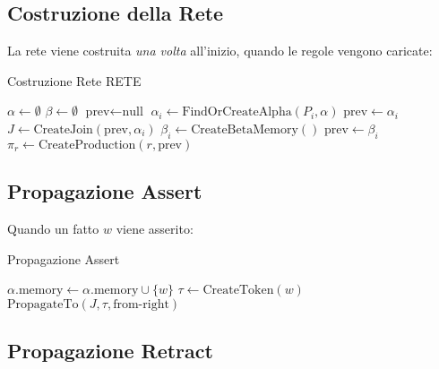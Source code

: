 \subsection{Costruzione della Rete}

La rete viene costruita \textit{una volta} all'inizio, quando le regole vengono caricate:

\begin{algorithm}[H]
\caption{Costruzione Rete RETE}
\begin{algorithmic}[1]
    \State $\alpha \gets \emptyset$ 
    \State $\beta \gets \emptyset$ 
        \State $\text{prev} \gets \text{null}$
            \State $\alpha_i \gets \text{FindOrCreateAlpha}(P_i, \alpha)$
                \State $\text{prev} \gets \alpha_i$ 
            \Else
                \State $J \gets \text{CreateJoin}(\text{prev}, \alpha_i)$
                \State $\beta_i \gets \text{CreateBetaMemory}()$
                \State $\text{prev} \gets \beta_i$
            \EndIf
        \EndFor
        \State $\pi_r \gets \text{CreateProduction}(r, \text{prev})$
    \EndFor
\EndFunction
\end{algorithmic}
\end{algorithm}

\subsection{Propagazione Assert}

Quando un fatto $w$ viene asserito:

\begin{algorithm}[H]
\caption{Propagazione Assert}
\begin{algorithmic}[1]
        \State $\alpha.\text{memory} \gets \alpha.\text{memory} \cup \{w\}$
        \State $\tau \gets \text{CreateToken}(w)$ 
            \State $\text{PropagateTo}(J, \tau, \text{from-right})$
        \EndFor
    \EndFor
\EndFunction
\end{algorithmic}
\end{algorithm}

\subsection{Propagazione Retract}

